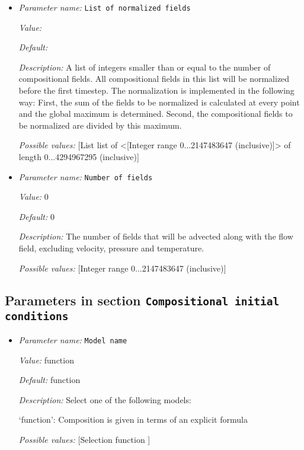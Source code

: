 \begin{itemize}
\item {\it Parameter name:} {\tt List of normalized fields}


{\it Value:} 


{\it Default:} 


{\it Description:} A list of integers smaller than or equal to the number of compositional fields. All compositional fields in this list will be normalized before the first timestep. The normalization is implemented in the following way: First, the sum of the fields to be normalized is calculated at every point and the global maximum is determined. Second, the compositional fields to be normalized are divided by this maximum.


{\it Possible values:} [List list of <[Integer range 0...2147483647 (inclusive)]> of length 0...4294967295 (inclusive)]
\item {\it Parameter name:} {\tt Number of fields}


{\it Value:} 0


{\it Default:} 0


{\it Description:} The number of fields that will be advected along with the flow field, excluding velocity, pressure and temperature.


{\it Possible values:} [Integer range 0...2147483647 (inclusive)]
\end{itemize}

\subsection{Parameters in section \tt Compositional initial conditions}
\label{parameters:Compositional_20initial_20conditions}

\begin{itemize}
\item {\it Parameter name:} {\tt Model name}


{\it Value:} function


{\it Default:} function


{\it Description:} Select one of the following models:

`function': Composition is given in terms of an explicit formula


{\it Possible values:} [Selection function ]
\end{itemize}



